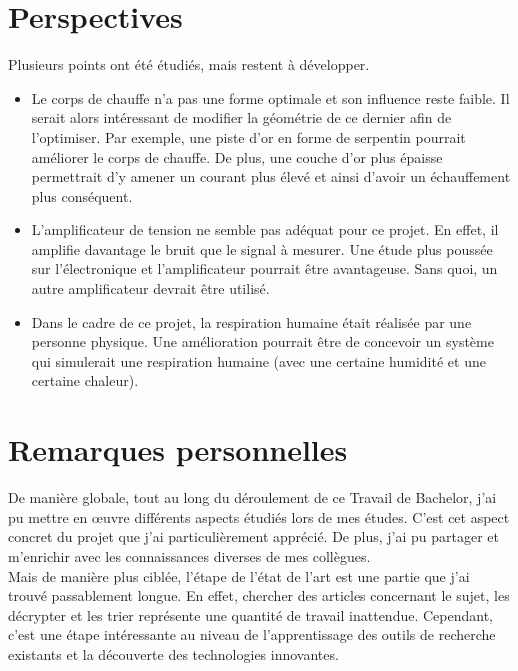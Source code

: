 \section{Perspectives}
Plusieurs points ont été étudiés, mais restent à développer. 
\begin{itemize}
    \item Le corps de chauffe n'a pas une forme optimale et son influence reste faible. Il serait alors intéressant de modifier la géométrie de ce
          dernier afin de l'optimiser. Par exemple, une piste d'or en forme de serpentin pourrait améliorer le corps de chauffe.  De plus, une 
          couche d'or plus épaisse permettrait d'y amener un courant plus élevé et ainsi d'avoir un échauffement plus conséquent. \\
    \item L'amplificateur de tension ne semble pas adéquat pour ce projet. En effet, il amplifie davantage le bruit que le signal à mesurer. Une
          étude plus poussée sur l'électronique et l'amplificateur pourrait être avantageuse. Sans quoi, un autre amplificateur devrait être utilisé. \\
    \item Dans le cadre de ce projet, la respiration humaine était réalisée par une personne physique. Une amélioration pourrait être de concevoir
          un système qui simulerait une respiration humaine (avec une certaine humidité et une certaine chaleur). 
\end{itemize}

\section{Remarques personnelles}
De manière globale, tout au long du déroulement de ce Travail de Bachelor, j'ai pu mettre en \oe uvre différents aspects étudiés lors de mes études. C'est cet 
aspect concret du projet que j'ai particulièrement apprécié. De plus, j'ai pu partager et m'enrichir avec les connaissances diverses de mes 
collègues. \\

Mais de manière plus ciblée, l'étape de l'état de l'art est une partie que j'ai trouvé passablement longue. En effet, chercher des articles concernant le sujet, les 
décrypter et les trier représente une quantité de travail inattendue. Cependant, c'est une étape intéressante au niveau de 
l'apprentissage des outils de recherche existants et la découverte des technologies innovantes. \\

